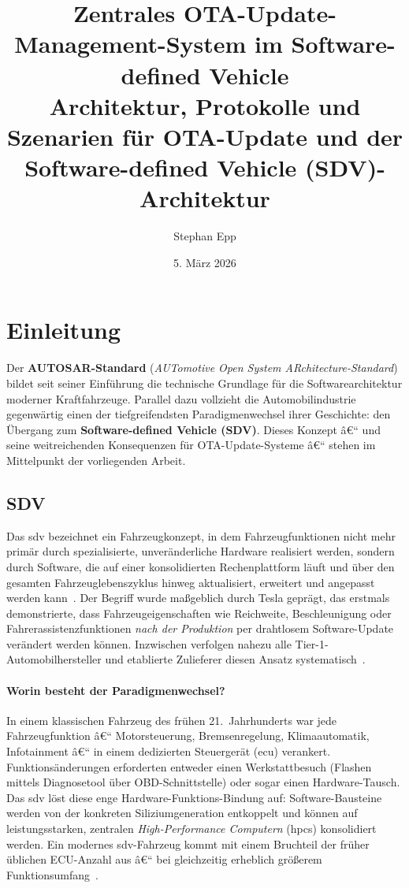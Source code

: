 ﻿\documentclass[12pt,a4paper,twoside]{article}
\title{
  {\textbf{Zentrales OTA-Update-Management-System im Software-defined Vehicle}\\
  {\Large Architektur, Protokolle und Szenarien für OTA-Update und der Software-defined Vehicle (SDV)-Architektur}}
}
\author{Stephan Epp}
\date{5. März 2026}
\begin{document}
\maketitle

\tableofcontents
\newpage


\section{Einleitung}
\label{sec:einleitung}

Der \textbf{AUTOSAR-Standard} (\textit{AUTomotive Open System ARchitecture-Standard})
bildet seit seiner Einführung die technische Grundlage für die
Softwarearchitektur moderner Kraftfahrzeuge. Parallel dazu vollzieht die
Automobilindustrie gegenwärtig einen der tiefgreifendsten Paradigmenwechsel
ihrer Geschichte: den Übergang zum \textbf{Software-defined Vehicle (SDV)}.
Dieses Konzept â€“ und seine weitreichenden Konsequenzen für OTA-Update-Systeme
â€“ stehen im Mittelpunkt der vorliegenden Arbeit.

\subsection{SDV}
\label{subsec:einl_sdv}

Das \gls{sdv} bezeichnet ein Fahrzeugkonzept, in dem Fahrzeugfunktionen
nicht mehr primär durch spezialisierte, unveränderliche Hardware realisiert
werden, sondern durch Software, die auf einer konsolidierten
Rechenplattform läuft und über den gesamten Fahrzeuglebenszyklus hinweg
aktualisiert, erweitert und angepasst werden kann~\cite{kugele2018sdv}.
Der Begriff wurde maßgeblich durch Tesla geprägt, das erstmals demonstrierte,
dass Fahrzeugeigenschaften wie Reichweite, Beschleunigung oder
Fahrerassistenzfunktionen \emph{nach der Produktion} per drahtlosem
Software-Update verändert werden können. Inzwischen verfolgen nahezu alle
Tier-1-Automobilhersteller und etablierte Zulieferer diesen Ansatz
systematisch~\cite{halder2020secure}.

\paragraph{Worin besteht der Paradigmenwechsel?}
In einem klassischen Fahrzeug des frühen 21.~Jahrhunderts war jede
Fahrzeugfunktion â€“ Motorsteuerung, Bremsenregelung, Klimaautomatik,
Infotainment â€“ in einem dedizierten Steuergerät (\gls{ecu}) verankert.
Funktionsänderungen erforderten entweder einen Werkstattbesuch (Flashen
mittels Diagnosetool über OBD-Schnittstelle) oder sogar einen
Hardware-Tausch. Das \gls{sdv} löst diese enge Hardware-Funktions-Bindung
auf: Software-Bausteine werden von der konkreten Siliziumgeneration
entkoppelt und können auf leistungsstarken, zentralen
\textit{High-Performance Computern} (\glspl{hpc}) konsolidiert werden.
Ein modernes \gls{sdv}-Fahrzeug kommt mit einem Bruchteil der früher
üblichen ECU-Anzahl aus â€“ bei gleichzeitig erheblich größerem
Funktionsumfang~\cite{broy2006challenges}.
\end{document}
